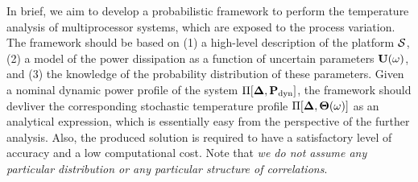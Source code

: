 In brief, we aim to develop a probabilistic framework to perform the temperature analysis of multiprocessor systems, which are exposed to the process variation. The framework should be based on (1) a high-level description of the platform $\mathcal{S}$, (2) a model of the power dissipation as a function of uncertain parameters $\vU(\o)$, and (3) the knowledge of the probability distribution of these parameters. Given a nominal dynamic power profile of the system $\prof{\mP_\dyn}$, the framework should devliver the corresponding stochastic temperature profile $\Pi[\boldsymbol{\Delta}, {\boldsymbol\Theta}(\omega)]$ as an analytical expression, which is essentially easy from the perspective of the further analysis. Also, the produced solution is required to have a satisfactory level of accuracy and a low computational cost. Note that \emph{we do not assume any particular distribution or any particular structure of correlations}.

